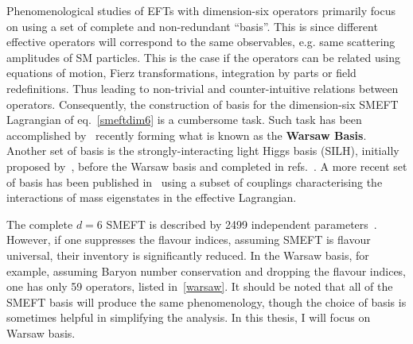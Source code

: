 \par Phenomenological studies of EFTs with dimension-six operators primarily focus on using a set of complete and non-redundant ``basis''. This is since different effective operators will correspond to the same observables, e.g. same scattering amplitudes of SM particles.  This is the case if the operators can be related using equations of motion, Fierz transformations, integration by parts or field redefinitions. Thus leading to non-trivial and counter-intuitive relations between operators. Consequently, the construction of basis for the dimension-six SMEFT Lagrangian of eq.~\eqref{smeftdim6} is a cumbersome task. Such task has been accomplished by~\cite{Grzadkowski:2010es} recently forming what is known as the \textbf{Warsaw Basis}.  Another set of basis is the strongly-interacting light Higgs basis (SILH), initially proposed by~\cite{Giudice:2007fh}, before the Warsaw basis and completed in refs.~\cite{Contino:2013kra, Elias-Miro:2013eta}. A more recent set of basis has been published in~\cite{Gupta:2014rxa} using a subset of couplings characterising the interactions of mass eigenstates in the effective Lagrangian.
\par The complete $d=6$ SMEFT is described by 2499 independent parameters~\cite{Jenkins:2013zja,Jenkins:2013wua,Alonso:2013hga}. However, if one suppresses the flavour indices, assuming SMEFT is flavour universal, their inventory is significantly reduced. In the Warsaw basis, for example, assuming Baryon number conservation and dropping the flavour indices, one has only 59 operators, listed in~\autoref{warsaw}. It should be noted that all of the SMEFT basis will produce the same phenomenology, though the choice of basis is sometimes helpful in simplifying the analysis. In this thesis, I will focus on Warsaw basis.\\ 
